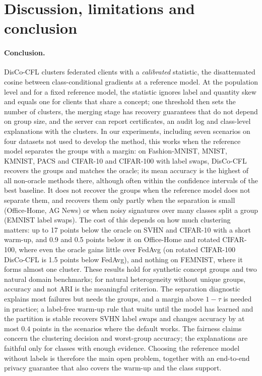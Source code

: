 \documentclass[pdflatex,sn-apa]{sn-jnl}
\theoremstyle{thmstyleone}
\theoremstyle{thmstylethree}
\begin{document}
\section{Discussion, limitations and conclusion}\label{sec:discussion}


\paragraph{Conclusion.} DisCo-CFL clusters federated clients with a \emph{calibrated} statistic, the disattenuated cosine between class-conditional gradients at a reference model. At the population level and for a fixed reference model, the statistic ignores label and quantity skew and equals one for clients that share a concept; one threshold then sets the number of clusters, the merging stage has recovery guarantees that do not depend on group size, and the server can report certificates, an audit log and class-level explanations with the clusters. In our experiments, including seven scenarios on four datasets not used to develop the method, this works when the reference model separates the groups with a margin: on Fashion-MNIST, MNIST, KMNIST, PACS and CIFAR-10 and CIFAR-100 with label swaps, DisCo-CFL recovers the groups and matches the oracle; its mean accuracy is the highest of all non-oracle methods there, although often within the confidence intervals of the best baseline. It does not recover the groups when the reference model does not separate them, and recovers them only partly when the separation is small (Office-Home, AG News) or when noisy signatures over many classes split a group (EMNIST label swaps). The cost of this depends on how much clustering matters: up to 17 points below the oracle on SVHN and CIFAR-10 with a short warm-up, and 0.9 and 0.5 points below it on Office-Home and rotated CIFAR-100, where even the oracle gains little over FedAvg (on rotated CIFAR-100 DisCo-CFL is 1.5 points below FedAvg), and nothing on FEMNIST, where it forms almost one cluster. These results hold for synthetic concept groups and two natural domain benchmarks; for natural heterogeneity without unique groups, accuracy and not ARI is the meaningful criterion. The separation diagnostic explains most failures but needs the groups, and a margin above $1-\tau$ is needed in practice; a label-free warm-up rule that waits until the model has learned and the partition is stable recovers SVHN label swaps and changes accuracy by at most $0.4$ points in the scenarios where the default works. The fairness claims concern the clustering decision and worst-group accuracy; the explanations are faithful only for classes with enough evidence. Choosing the reference model without labels is therefore the main open problem, together with an end-to-end privacy guarantee that also covers the warm-up and the class support.
\end{document}
